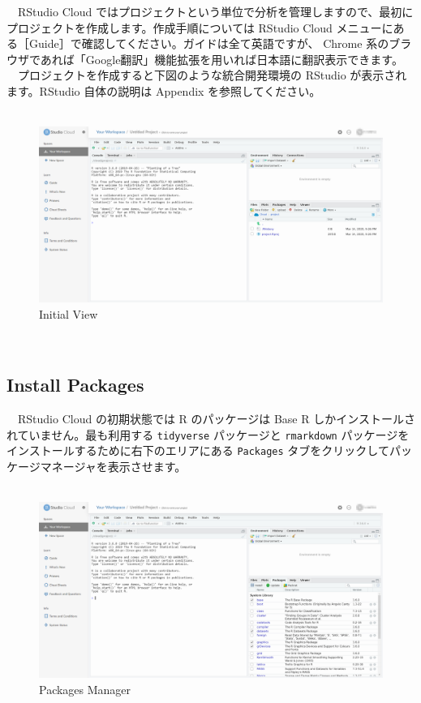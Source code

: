 \documentclass[
  12pt,
]{book}
\begin{document}
　RStudio Cloud ではプロジェクトという単位で分析を管理しますので、最初にプロジェクトを作成します。作成手順については RStudio Cloud メニューにある［Guide］で確認してください。ガイドは全て英語ですが、 Chrome 系のブラウザであれば「Google翻訳」機能拡張を用いれば日本語に翻訳表示できます。\\
　プロジェクトを作成すると下図のような統合開発環境の RStudio が表示されます。RStudio 自体の説明は Appendix を参照してください。\\
　\\

\begin{figure}[H]

{\centering \includegraphics[width=0.8\linewidth,]{fig/RStudio/RSCloud_01} 

}

\caption{Initial View}\label{fig:unnamed-chunk-82}
\end{figure}

　

\hypertarget{install-packages}{%
\subsection{Install Packages}\label{install-packages}}

　RStudio Cloud の初期状態では R のパッケージは Base R しかインストールされていません。最も利用する \texttt{tidyverse} パッケージと \texttt{rmarkdown} パッケージをインストールするために右下のエリアにある \texttt{Packages} タブをクリックしてパッケージマネージャを表示させます。\\
　\\

\begin{figure}[H]

{\centering \includegraphics[width=0.8\linewidth,]{fig/RStudio/RSCloud_02} 

}

\caption{Packages Manager}\label{fig:unnamed-chunk-83}
\end{figure}
\end{document}

